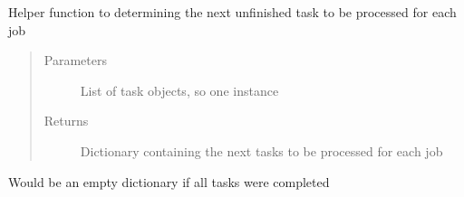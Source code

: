 \documentclass[letterpaper,10pt,english]{sphinxmanual}
\begin{document}
\begin{fulllineitems}
\label{\detokenize{agents.heuristic:agents.heuristic.heuristic_agent.get_active_task_dict}}
\sphinxAtStartPar
Helper function to determining the next unfinished task to be processed for each job
\begin{quote}\begin{description}
\item[{Parameters}] \leavevmode
\sphinxAtStartPar
{} \textendash{} List of task objects, so one instance

\item[{Returns}] \leavevmode
\sphinxAtStartPar
Dictionary containing the next tasks to be processed for each job

\end{description}\end{quote}

\sphinxAtStartPar
Would be an empty dictionary if all tasks were completed

\end{fulllineitems}

\end{document}
